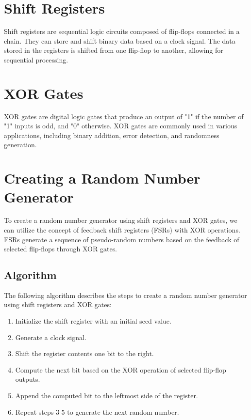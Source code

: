 \documentclass{article}
\begin{document}
\section{Shift Registers}

Shift registers are sequential logic circuits composed of flip-flops connected in a chain. They can store and shift binary data based on a clock signal. The data stored in the registers is shifted from one flip-flop to another, allowing for sequential processing.

\section{XOR Gates}

XOR gates are digital logic gates that produce an output of "1" if the number of "1" inputs is odd, and "0" otherwise. XOR gates are commonly used in various applications, including binary addition, error detection, and randomness generation.

\section{Creating a Random Number Generator}

To create a random number generator using shift registers and XOR gates, we can utilize the concept of feedback shift registers (FSRs) with XOR operations. FSRs generate a sequence of pseudo-random numbers based on the feedback of selected flip-flops through XOR gates.

\subsection{Algorithm}

The following algorithm describes the steps to create a random number generator using shift registers and XOR gates:

\begin{enumerate}
    \item Initialize the shift register with an initial seed value.
    \item Generate a clock signal.
    \item Shift the register contents one bit to the right.
    \item Compute the next bit based on the XOR operation of selected flip-flop outputs.
    \item Append the computed bit to the leftmost side of the register.
    \item Repeat steps 3-5 to generate the next random number.
\end{enumerate}
\end{document}
